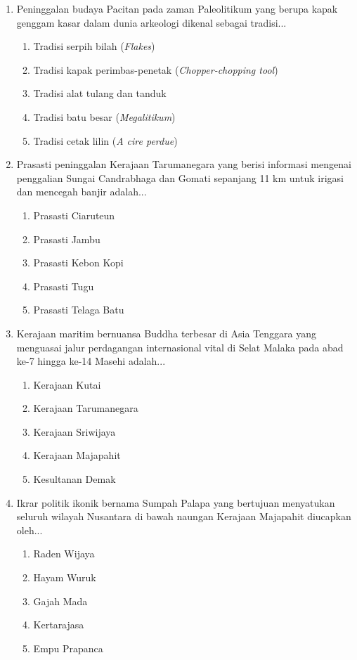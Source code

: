 \documentclass[12pt, a4paper]{article}
\begin{document}
\begin{enumerate}[label=\arabic*.]
    \item Peninggalan budaya Pacitan pada zaman Paleolitikum yang berupa kapak genggam kasar dalam dunia arkeologi dikenal sebagai tradisi...
    \begin{enumerate}[label=\Alph*.]
        \item Tradisi serpih bilah (\textit{Flakes})
        \item Tradisi kapak perimbas-penetak (\textit{Chopper-chopping tool})
        \item Tradisi alat tulang dan tanduk
        \item Tradisi batu besar (\textit{Megalitikum})
        \item Tradisi cetak lilin (\textit{A cire perdue})
    \end{enumerate}

    \item Prasasti peninggalan Kerajaan Tarumanegara yang berisi informasi mengenai penggalian Sungai Candrabhaga dan Gomati sepanjang 11 km untuk irigasi dan mencegah banjir adalah...
    \begin{enumerate}[label=\Alph*.]
        \item Prasasti Ciaruteun
        \item Prasasti Jambu
        \item Prasasti Kebon Kopi
        \item Prasasti Tugu
        \item Prasasti Telaga Batu
    \end{enumerate}

    \item Kerajaan maritim bernuansa Buddha terbesar di Asia Tenggara yang menguasai jalur perdagangan internasional vital di Selat Malaka pada abad ke-7 hingga ke-14 Masehi adalah...
    \begin{enumerate}[label=\Alph*.]
        \item Kerajaan Kutai
        \item Kerajaan Tarumanegara
        \item Kerajaan Sriwijaya
        \item Kerajaan Majapahit
        \item Kesultanan Demak
    \end{enumerate}

    \item Ikrar politik ikonik bernama Sumpah Palapa yang bertujuan menyatukan seluruh wilayah Nusantara di bawah naungan Kerajaan Majapahit diucapkan oleh...
    \begin{enumerate}[label=\Alph*.]
        \item Raden Wijaya
        \item Hayam Wuruk
        \item Gajah Mada
        \item Kertarajasa
        \item Empu Prapanca
    \end{enumerate}


\end{enumerate}
\end{document}
